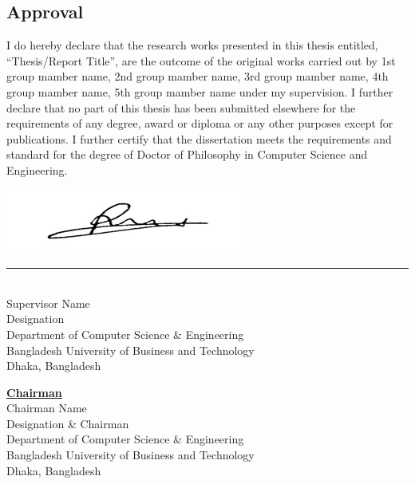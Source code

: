 \begin{center}
    \section*{Approval}
\end{center}


I do hereby declare that the research works presented in this thesis entitled, “Thesis/Report Title”, are the outcome of the original works carried out by 1st group mamber name, 2nd group mamber name, 3rd group mamber name, 4th group mamber name, 5th group mamber name under my supervision. I further declare that no part of this thesis has been submitted elsewhere for the requirements of any degree, award or diploma or any other purposes except for publications. I further certify that the dissertation meets the requirements and standard for the degree of Doctor of Philosophy in Computer Science and Engineering.

\vspace{20mm}

\includegraphics[scale=0.8]{khaled.png} \null\hfill\\
\noindent\rule{9.3cm}{0.2pt} \\ 
Supervisor Name \\
Designation \\
Department of Computer Science \& Engineering \\
Bangladesh University of Business and Technology\\
Dhaka, Bangladesh\\




\vspace{20mm}

\begin{flushleft}
\textbf{\underline{Chairman}} \null\hfill  \\
Chairman Name \\
Designation \& Chairman \\
Department of Computer Science \& Engineering \\
Bangladesh University of Business and Technology\\
Dhaka, Bangladesh\\
\end{flushleft}